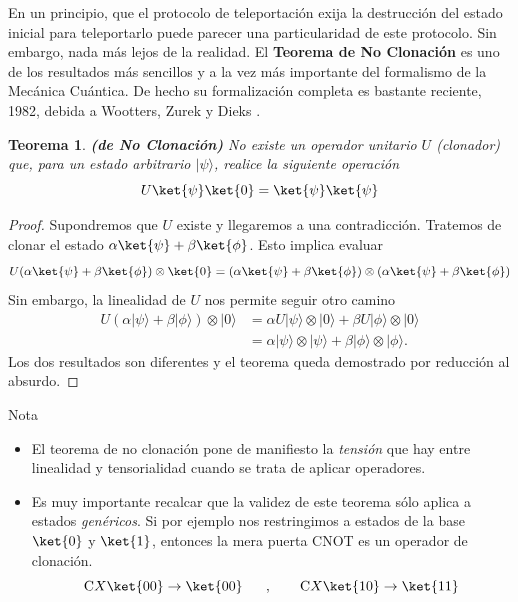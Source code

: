 \documentclass[a4paper,11pt]{book} %
\newtheorem{teorema_contador}{Teorema}
\newcommand{\Teorema}[1]{
		\begin{mybox_gray2}{}
			\begin{teorema_contador}
				 #1 
			\end{teorema_contador} 
		\end{mybox_gray2}
	}
\numberwithin{equation}{chapter}
\newcommand{\cg}[1]{{\rm C}#1}
\begin{document}
	En un principio, que el protocolo de teleportación exija la destrucción del estado inicial para teleportarlo puede parecer una particularidad de este protocolo. Sin embargo, nada más lejos de la realidad.
	El \textbf{Teorema de No Clonación} es uno de los resultados más sencillos y a la vez más importante del formalismo de la Mecánica Cuántica. De hecho su formalización completa es bastante reciente, 1982, debida a Wootters, Zurek \cite{clone2} y Dieks \cite{clone1}.
	
	\Teorema{ \textbf{(de No Clonación)} No existe un operador unitario $U$ (clonador) que, para un estado arbitrario $|\psi\rangle$, realice la siguiente operación
		\begin{equation}
		U \ket{\psi}\ket{0} = \ket{\psi}\ket{\psi}
		\end{equation}}

	\begin{proof}
	Supondremos que $U$ existe y llegaremos a una contradicción. 
	Tratemos de clonar el estado $\alpha\ket{\psi}+\beta\ket{\phi}$. Esto implica evaluar
		\begin{equation*}
		U (\alpha\ket{\psi}+\beta\ket{\phi})\otimes \ket{0} = 	(\alpha\ket{\psi}+\beta\ket{\phi})\otimes (\alpha\ket{\psi}+\beta\ket{\phi})
		\end{equation*}	
	Sin embargo, la linealidad de $U$ nos permite seguir otro camino
		\begin{align*}
		U(\alpha|\psi\rangle+\beta|\phi\rangle) \otimes|0\rangle 
			& = \alpha U|\psi\rangle \otimes|0\rangle+\beta U|\phi\rangle \otimes|0\rangle  \\
			& = \alpha|\psi\rangle \otimes|\psi\rangle+\beta|\phi\rangle \otimes|\phi\rangle . 
		\end{align*}
	Los dos resultados son diferentes y el teorema queda demostrado por reducción al absurdo.
	\end{proof}


	\begin{mybox_blue}{Nota}
	\begin{itemize}
		\item El teorema de no clonación pone  de manifiesto la  \textit{tensión} que hay entre linealidad y tensorialidad cuando se trata de aplicar operadores.
		\item Es muy importante recalcar que la validez de este teorema sólo aplica a estados \textit{genéricos}. 
	Si por ejemplo nos restringimos a estados de la base $\ket{0}$ y $\ket{1}$, entonces la mera puerta CNOT es un operador de clonación.
    $$
	\cg{X}\ket{00}\to \ket{00}~~~~~,~~~~~~ \cg{X}\ket{10}\to \ket{11}
	$$
	\end{itemize}		 
	\end{mybox_blue}
\end{document}
